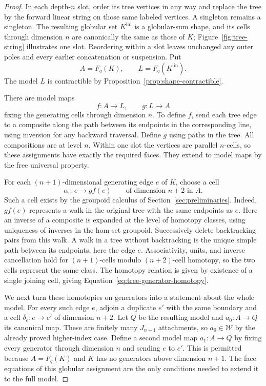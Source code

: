 \documentclass[11pt,letterpaper]{article}
\numberwithin{equation}{section}
\theoremstyle{plain}
\theoremstyle{definition}
\theoremstyle{remark}
\begin{document}
\begin{proof}
In each depth-$n$ slot, order its tree vertices in any way and
replace the tree by the forward linear string on those same
labeled vertices.  A singleton remains a singleton.  The resulting
globular set $K^{\mathrm{lin}}$ is a globular-sum shape, and its
cells through dimension $n$ are canonically the same as those of
$K$; Figure~\ref{fig:tree-string} illustrates one slot.  Reordering
within a slot leaves unchanged any outer poles and
every earlier concatenation or suspension.  Put
\[
 A=F_q(K),\qquad L=F_q(K^{\mathrm{lin}}).
\]
The model $L$ is contractible by
Proposition~\ref{prop:shape-contractible}.

There are model maps
\[
 f:A\longrightarrow L,\qquad g:L\longrightarrow A
\]
fixing the generating cells through dimension $n$.  To define
$f$, send each tree edge to a composite along the path between
its endpoints in the corresponding line, using inversion for
any backward traversal.  Define $g$ using paths in the tree.
All compositions are at level $n$.  Within one slot the vertices
are parallel $n$-cells, so these assignments have exactly the
required faces.  They extend to model maps by the free universal
property.

For each $(n+1)$-dimensional generating edge $e$ of $K$, choose
a cell
\begin{equation}\label{eq:tree-generator-homotopy}
 \alpha_e:e\longrightarrow gf(e)
 \qquad\text{of dimension }n+2\text{ in }A.
\end{equation}
Such a cell exists by the groupoid calculus of
Section~\ref{sec:preliminaries}.  Indeed, $gf(e)$ represents a
walk in the original tree with the same endpoints as $e$.
Here an inverse of a composite is expanded at the level of homotopy
classes, using uniqueness of inverses in the hom-set groupoid.
Successively delete backtracking pairs from this walk.  A walk
in a tree without backtracking is the unique simple path between
its endpoints, here the edge $e$.  Associativity, units, and
inverse cancellation hold for $(n+1)$-cells modulo
$(n+2)$-cell homotopy, so the two cells represent the same class.
The homotopy relation is given by existence of a single joining
cell, giving Equation~\eqref{eq:tree-generator-homotopy}.

We next turn these homotopies on generators into a statement
about the whole model.  For every such edge $e$, adjoin a
duplicate $e'$ with the same boundary and a cell
$\delta_e:e\to e'$ of dimension $n+2$.  Let $Q$ be the resulting
model and $a_0:A\to Q$ its canonical map.  These are finitely
many $J_{n+1}$ attachments, so $a_0\in\mathcal W$ by the already
proved higher-index case.  Define a second model map
$a_1:A\to Q$ by fixing every generator through dimension $n$
and sending $e$ to $e'$.  This is permitted because
$A=F_q(K)$ and $K$ has no generators above dimension $n+1$.
The face equations of this globular assignment are the only
conditions needed to extend it to the full model.


\end{proof}
\end{document}
